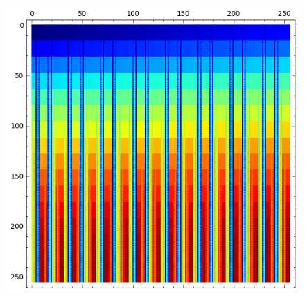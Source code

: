 \documentclass[pdf,sprung,slideColor,nocolorBG]{beamer}
\newenvironment{colortheme}[1]{
\def\ProvidesPackageRCS $##1${\relax}
\renewcommand{\ProcessOptions}{\relax}
\makeatletter

\makeatother
}{}
\begin{document}
\begin{colortheme}{jubata}
\begin{frame}
\begin{figure}
\begin{minipage}{.48\textwidth}
\includegraphics[width=.9\linewidth]{../matrix_plot/cast128_6_17_bent_cayley_graph_index_matrix.png}
  \label{fig:cast128_6_17_bent_cayley_graph_index_matrix}
\end{minipage}%
\end{figure}
\end{frame}


\end{colortheme}
\end{document}
